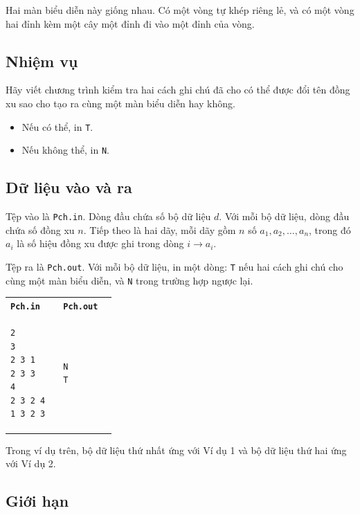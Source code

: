 \documentclass[11pt]{article}
\begin{document}
Hai màn biểu diễn này giống nhau. Có một vòng tự khép riêng lẻ, và có một vòng
hai đỉnh kèm một cây một đỉnh đi vào một đỉnh của vòng.

\subsection{Nhiệm vụ}

Hãy viết chương trình kiểm tra hai cách ghi chú đã cho có thể được đổi tên
đồng xu sao cho tạo ra cùng một màn biểu diễn hay không.

\begin{itemize}
  \item Nếu có thể, in \texttt{T}.
  \item Nếu không thể, in \texttt{N}.
\end{itemize}

\subsection{Dữ liệu vào và ra}

Tệp vào là \texttt{Pch.in}. Dòng đầu chứa số bộ dữ liệu \(d\). Với mỗi bộ dữ
liệu, dòng đầu chứa số đồng xu \(n\). Tiếp theo là hai dãy, mỗi dãy gồm \(n\)
số \(a_1,a_2,\ldots,a_n\), trong đó \(a_i\) là số hiệu đồng xu được ghi trong
dòng \(i\to a_i\).

Tệp ra là \texttt{Pch.out}. Với mỗi bộ dữ liệu, in một dòng: \texttt{T} nếu hai
cách ghi chú cho cùng một màn biểu diễn, và \texttt{N} trong trường hợp ngược
lại.

\begin{center}
\begin{tabular}{p{0.42\linewidth}p{0.42\linewidth}}
\textbf{\texttt{Pch.in}} & \textbf{\texttt{Pch.out}}\\
\begin{verbatim}
2
3
2 3 1
2 3 3
4
2 3 2 4
1 3 2 3
\end{verbatim}
&
\begin{verbatim}
N
T
\end{verbatim}
\end{tabular}
\end{center}

Trong ví dụ trên, bộ dữ liệu thứ nhất ứng với Ví dụ 1 và bộ dữ liệu thứ hai
ứng với Ví dụ 2.

\subsection{Giới hạn}
\end{document}
